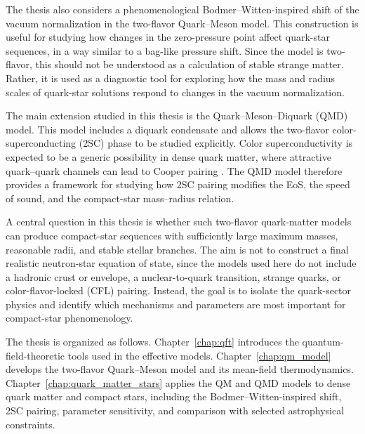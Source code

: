 The thesis also considers a phenomenological Bodmer--Witten-inspired shift of
the vacuum normalization in the two-flavor Quark--Meson model. This construction
is useful for studying how changes in the zero-pressure point affect quark-star
sequences, in a way similar to a bag-like pressure shift. Since the model is
two-flavor, this should not be understood as a calculation of stable strange
matter. Rather, it is used as a diagnostic tool for exploring how the mass and
radius scales of quark-star solutions respond to changes in the vacuum
normalization.

The main extension studied in this thesis is the Quark--Meson--Diquark (QMD) model. This model includes
a diquark condensate and allows the two-flavor color-superconducting (2SC) phase to be studied explicitly. Color
superconductivity is expected to be a generic possibility in dense quark matter,
where attractive quark--quark channels can lead to Cooper pairing
\cite{Alford2008}. The QMD model therefore provides a framework for studying how
2SC pairing modifies the EoS, the speed of sound, and the compact-star
mass--radius relation.

A central question in this thesis is whether such two-flavor quark-matter models
can produce compact-star sequences with sufficiently large maximum masses,
reasonable radii, and stable stellar branches. The aim is not to construct a
final realistic neutron-star equation of state, since the models used here do
not include a hadronic crust or envelope, a nuclear-to-quark transition, strange
quarks, or color-flavor-locked (CFL) pairing. Instead, the
goal is to isolate the quark-sector physics and identify which mechanisms and
parameters are most important for compact-star phenomenology.

The thesis is organized as follows. Chapter~\ref{chap:qft} introduces the
quantum-field-theoretic tools used in the effective models.
Chapter~\ref{chap:qm_model} develops the two-flavor Quark--Meson model and its
mean-field thermodynamics. Chapter~\ref{chap:quark_matter_stars} applies the QM
and QMD models to dense quark matter and compact stars, including the
Bodmer--Witten-inspired shift, 2SC pairing, parameter sensitivity, and comparison
with selected astrophysical constraints.
